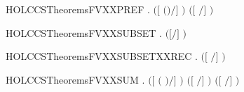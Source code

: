 \newcommand{\HOLCCSTheoremsFVXXPAR}{\UseVerbatim{HOLCCSTheoremsFVXXPAR}}
\begin{SaveVerbatim}{HOLCCSTheoremsFVXXPREF}
\HOLTokenTurnstile{} \HOLSymConst{\HOLTokenForall{}}   .  \ensuremath{(}\ensuremath{[}  \ensuremath{(}\HOLSymConst{\ensuremath{\ldotp}}\ensuremath{)}\ensuremath{/}\ensuremath{]} \ensuremath{)} \HOLSymConst{\ensuremath{=}}  \ensuremath{(}\ensuremath{[}  \ensuremath{/}\ensuremath{]} \ensuremath{)}
\end{SaveVerbatim}
\newcommand{\HOLCCSTheoremsFVXXPREF}{\UseVerbatim{HOLCCSTheoremsFVXXPREF}}
\begin{SaveVerbatim}{HOLCCSTheoremsFVXXSUBSET}
\HOLTokenTurnstile{} \HOLSymConst{\HOLTokenForall{}}  .  \ensuremath{(}\ensuremath{[}\ensuremath{/}\ensuremath{]} \ensuremath{)} \HOLConst{\HOLTokenSubset{}}   \HOLConst{\HOLTokenUnion{}}  
\end{SaveVerbatim}
\newcommand{\HOLCCSTheoremsFVXXSUBSET}{\UseVerbatim{HOLCCSTheoremsFVXXSUBSET}}
\begin{SaveVerbatim}{HOLCCSTheoremsFVXXSUBSETXXREC}
\HOLTokenTurnstile{} \HOLSymConst{\HOLTokenForall{}} .  \ensuremath{(}\ensuremath{[}  \ensuremath{/}\ensuremath{]} \ensuremath{)} \HOLConst{\HOLTokenSubset{}}  
\end{SaveVerbatim}
\newcommand{\HOLCCSTheoremsFVXXSUBSETXXREC}{\UseVerbatim{HOLCCSTheoremsFVXXSUBSETXXREC}}
\begin{SaveVerbatim}{HOLCCSTheoremsFVXXSUM}
\HOLTokenTurnstile{} \HOLSymConst{\HOLTokenForall{}}   .
        \ensuremath{(}\ensuremath{[}  \ensuremath{(} \HOLSymConst{\ensuremath{+}} \ensuremath{)}\ensuremath{/}\ensuremath{]} \ensuremath{)} \HOLSymConst{\ensuremath{=}}
        \ensuremath{(}\ensuremath{[}  \ensuremath{/}\ensuremath{]} \ensuremath{)} \HOLConst{\HOLTokenUnion{}}  \ensuremath{(}\ensuremath{[}  \ensuremath{/}\ensuremath{]} \ensuremath{)}
\end{SaveVerbatim}
